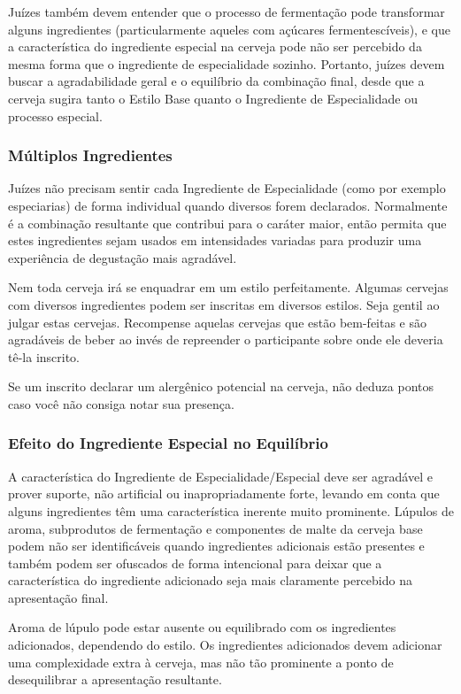 Juízes também devem entender que o processo de fermentação pode transformar alguns ingredientes (particularmente aqueles com açúcares fermentescíveis), e que a característica do ingrediente especial na cerveja pode não ser percebido da mesma forma que o ingrediente de especialidade sozinho. Portanto, juízes devem buscar a agradabilidade geral e o equilíbrio da combinação final, desde que a cerveja sugira tanto o Estilo Base quanto o Ingrediente de Especialidade ou processo especial.

\subsubsection*{Múltiplos Ingredientes}
Juízes não precisam sentir cada Ingrediente de Especialidade (como por exemplo especiarias) de forma individual quando diversos forem declarados. Normalmente é a combinação resultante que contribui para o caráter maior, então permita que estes ingredientes sejam usados em intensidades variadas para produzir uma experiência de degustação mais agradável.

Nem toda cerveja irá se enquadrar em um estilo perfeitamente. Algumas cervejas com diversos ingredientes podem ser inscritas em diversos estilos. Seja gentil ao julgar estas cervejas. Recompense aquelas cervejas que estão bem-feitas e são agradáveis de beber ao invés de repreender o participante sobre onde ele deveria tê-la inscrito.

Se um inscrito declarar um alergênico potencial na cerveja, não deduza pontos caso você não consiga notar sua presença.

\subsubsection*{Efeito do Ingrediente Especial no Equilíbrio}
A característica do Ingrediente de Especialidade/Especial deve ser agradável e prover suporte, não artificial ou inapropriadamente forte, levando em conta que alguns ingredientes têm uma característica inerente muito prominente. Lúpulos de aroma, subprodutos de fermentação e componentes de malte da cerveja base podem não ser identificáveis quando ingredientes adicionais estão presentes e também podem ser ofuscados de forma intencional para deixar que a característica do ingrediente adicionado seja mais claramente percebido na apresentação final.

Aroma de lúpulo pode estar ausente ou equilibrado com os ingredientes adicionados, dependendo do estilo. Os ingredientes adicionados devem adicionar uma complexidade extra à cerveja, mas não tão prominente a ponto de desequilibrar a apresentação resultante.
